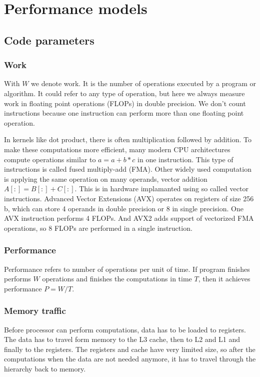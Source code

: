 {%
\chapter{Performance models}

\section{Code parameters}

\subsection*{Work}

With $W$ we denote work. It is the number of operations executed by a program or algorithm. It could refer to any type of operation, but here we always measure work in floating point operations (FLOPs) in double precision.
We don't count instructions because one instruction can perform more than one floating point operation.

In kernels like dot product, there is often multiplication followed by addition. To make these computations more efficient, many modern CPU architectures compute operations similar to $a=a+b*c$ in one instruction. This type of instructions is called fused multiply-add (FMA).
Other widely used computation is applying the same operation on many operands, vector addition $A[:]=B[:]+C[:]$. This is in hardware implamanted using so called vector instructions. Advanced Vector Extensions (AVX) operates on registers of size 256\,b, which can store 4 operands in double precision or 8 in single precision. One AVX instruction performs 4 FLOPs. And AVX2 adds support of vectorized FMA operations, so 8 FLOPs are performed in a single instruction.

\subsection*{Performance}

Performance refers to number of operations per unit of time.
If program finishes performs $W$ operations and finishes the computations in time $T$, then it achieves performance $P = W/T$.

\subsection*{Memory traffic}

Before processor can perform computations, data has to be loaded to registers. The data has to travel form memory to the L3 cache, then to L2 and L1 and finally to the registers. The registers and cache have very limited size, so after the computations when the data are not needed anymore, it has to travel through the hierarchy back to memory.

}
